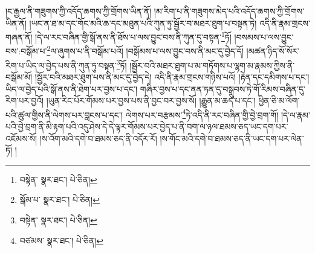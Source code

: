།ང་རྒྱལ་ནི་གཟུགས་ཀྱི་འདོད་ཆགས་ཀྱི་གྲོགས་ཡིན་ནོ། །མ་རིག་པ་ནི་གཟུགས་མེད་པའི་འདོད་ཆགས་ཀྱི་གྲོགས་ཡིན་ནོ། །ཡང་ན་ཐ་མ་དང་གོང་མའི་ཆ་དང་མཐུན་པའི་ཀུན་ཏུ་སྦྱོར་བ་མཐར་ཐུག་པ་བསྟན་ཏེ། འདི་ནི་རྣམ་གྲངས་གཞན་ནོ། །དེ་ལ་རང་བཞིན་གྱི་སྒོ་ནས་ནི་ཐོས་པ་ལས་བྱུང་བས་ནི་ཀུན་དུ་བསྟན་\footnote{བསྟེན་  སྣར་ཐང་།  པེ་ཅིན། }ཏོ། །བསམས་པ་ལས་བྱུང་བས་:བསྒོམ་པ་\footnote{སྒོམ་པ་  སྣར་ཐང་།  པེ་ཅིན། }ལ་ཞུགས་པ་ནི་བསྒོམ་པའོ། །བསྒོམས་པ་ལས་བྱུང་བས་ནི་མང་དུ་བྱེད་དོ། །མཚན་ཉིད་སོ་སོར་རིག་པ་ཡིད་ལ་བྱེད་པས་ནི་ཀུན་ཏུ་བསྟན་\footnote{བསྟེན་  སྣར་ཐང་།  པེ་ཅིན། }ཏོ། །སྦྱོར་བའི་མཐར་ཐུག་པ་མ་གཏོགས་པ་ལྷག་མ་རྣམས་ཀྱིས་ནི་བསྒོམ་མོ། །སྦྱོར་བའི་མཐར་ཐུག་པས་ནི་མང་དུ་བྱེད་དེ། འདི་ནི་རྣམ་གྲངས་གཉིས་པའོ། །རྟེན་དང་དམིགས་པ་དང་། ཡིད་ལ་བྱེད་པའི་སྒོ་ནས་ནི་ཐེག་པར་བྱས་པ་དང་། གཞིར་བྱས་པ་དང་ནན་ཏན་དུ་བསྒྲུབས་ཏེ་གོ་རིམས་བཞིན་དུ་རིག་པར་བྱའོ། །ཡུན་རིང་པོར་གོམས་པར་བྱས་པས་ནི་བྱང་བར་བྱས་སོ། །རྒྱུན་མ་ཆད་པ་དང་། ཕྱིན་ཅི་མ་ལོག་པའི་ཚུལ་གྱིས་ནི་ལེགས་པར་བླངས་པ་དང་། ལེགས་པར་བརྩམས་\footnote{བཙམས་  སྣར་ཐང་།  པེ་ཅིན། }ཏེ་འདི་ནི་རང་བཞིན་གྱི་བྱེ་བྲག་གོ། །དེ་ལ་རྣམ་པའི་བྱེ་བྲག་ནི་མི་རྟག་པའི་འདུ་ཤེས་དེ་དེ་ལྟར་གོམས་པར་བྱེད་པ་ནི་བག་ལ་ཉལ་ཐམས་ཅད་ཡང་དག་པར་འཇོམས་སོ། །ས་འོག་མའི་དགེ་བ་ཐམས་ཅད་ནི་འདོར་རོ། །ས་གོང་མའི་དགེ་བ་ཐམས་ཅད་ནི་ཡང་དག་པར་ལེན་ཏོ། །
